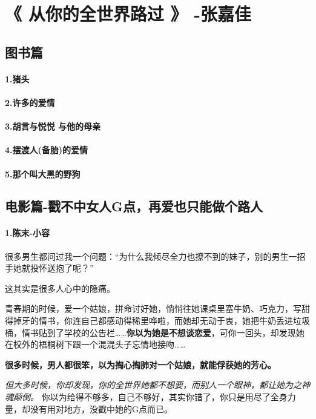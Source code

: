 \documentclass[UTF8,a4paper,8pt]{ctexbook}
\begin{document}
		\newpage			
	\section{《 从你的全世界路过 》 -张嘉佳   }  	
		\subsection{图书篇}		
			\paragraph{1.猪头}
			\paragraph{2.许多的爱情}
			\paragraph{3.胡言与悦悦 与他的母亲}
			\paragraph{4.摆渡人(备胎)的爱情}
			\paragraph{5.那个叫大黑的野狗}
			
		\subsection{电影篇-戳不中女人G点，再爱也只能做个路人}
			\paragraph{1.陈末-小容}
				很多男生都问过我一个问题：“为什么我倾尽全力也撩不到的妹子，别的男生一招手她就投怀送抱了呢？”
				
				这其实是很多人心中的隐痛。
				
				青春期的时候，爱一个姑娘，拼命讨好她，悄悄往她课桌里塞牛奶、巧克力，写甜得掉牙的情书，你连自己都感动得稀里哗啦，而她却无动于衷，她把牛奶丢进垃圾桶，情书贴到了学校的公告栏……\textbf{你以为她是不想谈恋爱}，可你一回头，却发现她在校外的梧桐树下跟一个混混头子忘情地接吻……
				
				\textbf{很多时候，男人都很笨，以为掏心掏肺对一个姑娘，就能俘获她的芳心。}
				
				\textit{但大多时候，你却发现，你的全世界她都不想要，而别人一个眼神，都让她为之神魂颠倒。}
				你以为给得不够多，自己不够好，其实你错了，你只是用尽了全身力量，却没有用对地方，没戳中她的G点而已。
				
\end{document}
